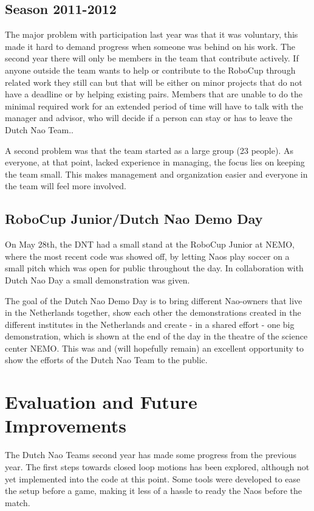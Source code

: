 \documentclass[11pt,a4paper,oneside]{article}
\begin{document}
\subsection{Season 2011-2012}
The major problem with participation last year was that it was voluntary, this made it hard to demand progress when someone was behind on his work. The second year there will only be members in the team that contribute actively. If anyone outside the team wants to help or contribute to the RoboCup through related work they still can but that will be either on minor projects that do not have a deadline or by helping existing pairs. Members that are unable to do the minimal required work for an extended period of time will have to talk with the manager and advisor, who will decide if a person can stay or has to leave the Dutch Nao Team..

A second problem was that the team started as a large group (23 people). As everyone, at that point, lacked experience in managing, the focus lies on keeping the team small. This makes management and organization easier and everyone in the team will feel more involved.  

\subsection{RoboCup Junior/Dutch Nao Demo Day}
On May 28th, the DNT had a small stand at the RoboCup Junior at NEMO, where the most recent code was showed off, by letting Naos play soccer on a small pitch which was open for public throughout the day. In collaboration with Dutch Nao Day a small demonstration was given.
 
The goal of the Dutch Nao Demo Day is to bring different Nao-owners that live in the Netherlands together, show each other the demonstrations created in the different institutes in the Netherlands and create - in a shared effort - one big demonstration, which is shown at the end of the day in the theatre of the science center NEMO. This was and (will hopefully remain) an excellent opportunity to show the efforts of the Dutch Nao Team to the public. 

\section{Evaluation and Future Improvements}

The Dutch Nao Teams second year has made some progress from the previous year. The first steps towards closed loop motions has been explored, although not yet implemented into the code at this point. Some tools were developed to ease the setup before a game, making it less of a hassle to ready the Naos before the match.
\end{document}
